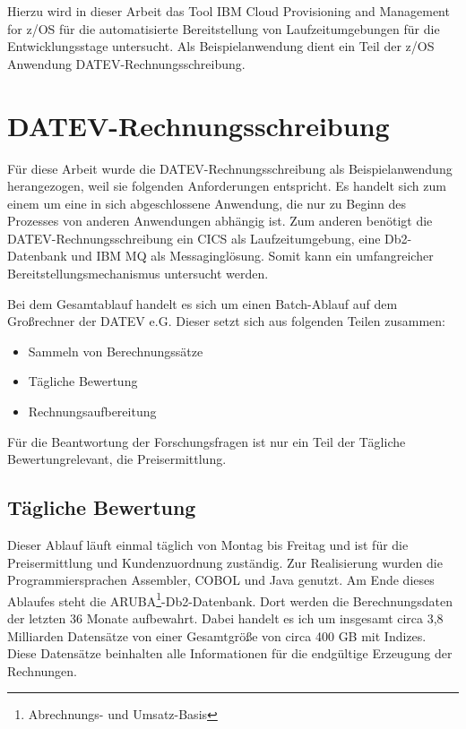 Hierzu wird in dieser Arbeit das Tool \glqq IBM Cloud Provisioning and Management for z/OS\grqq{} für die automatisierte Bereitstellung von Laufzeitumgebungen für die Entwicklungsstage untersucht.
Als Beispielanwendung dient ein Teil der z/OS Anwendung \glqq DATEV-Rechnungsschreibung\grqq.

\section{DATEV-Rechnungsschreibung}\label{rechBesch}
Für diese Arbeit wurde die DATEV-Rechnungsschreibung als Beispielanwendung herangezogen, weil sie folgenden Anforderungen entspricht.
Es handelt sich zum einem um eine in sich abgeschlossene Anwendung, die nur zu Beginn des Prozesses von anderen Anwendungen abhängig ist.
Zum anderen benötigt die DATEV-Rechnungsschreibung ein CICS als Laufzeitumgebung, eine Db2-Datenbank und IBM MQ als Messaginglösung.
Somit kann ein umfangreicher Bereitstellungsmechanismus untersucht werden.

Bei dem Gesamtablauf handelt es sich um einen Batch-Ablauf auf dem Großrechner der DATEV e.G.
Dieser setzt sich aus folgenden Teilen zusammen:
\begin{itemize}
\item Sammeln von Berechnungssätze
\item Tägliche Bewertung
\item Rechnungsaufbereitung
\end{itemize}
Für die Beantwortung der Forschungsfragen ist nur ein Teil der \glqq Tägliche Bewertung\grqq relevant, die Preisermittlung.

\subsection{Tägliche Bewertung}\label{sssec:täglbew}
Dieser Ablauf läuft einmal täglich von Montag bis Freitag und ist für die Preisermittlung und Kundenzuordnung zuständig.
Zur Realisierung wurden die Programmiersprachen Assembler, COBOL und Java genutzt.
Am Ende dieses Ablaufes steht die ARUBA\footnote{Abrechnungs- und Umsatz-Basis}-Db2-Datenbank.
Dort werden die Berechnungsdaten der letzten 36 Monate aufbewahrt.
Dabei handelt es ich um insgesamt circa 3,8 Milliarden Datensätze von einer Gesamtgröße von circa 400 GB mit Indizes.
Diese Datensätze beinhalten alle Informationen für die endgültige Erzeugung der Rechnungen.

